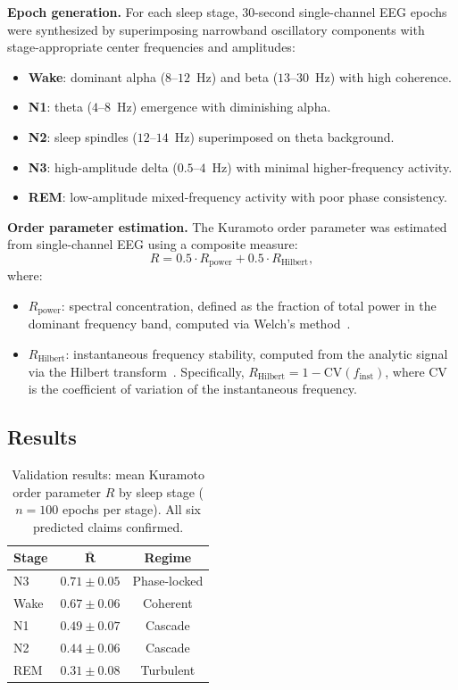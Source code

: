 \documentclass[aps,prd,twocolumn,superscriptaddress,floatfix,nofootinbib]{revtex4-2}
\theoremstyle{remark}
\newcommand{\Rorder}{R}
\begin{document}
\textbf{Epoch generation.} For each sleep stage, 30-second single-channel EEG epochs were synthesized by superimposing narrowband oscillatory components with stage-appropriate center frequencies and amplitudes:
\begin{itemize}
    \item \textbf{Wake}: dominant alpha ($8$--$12$~Hz) and beta ($13$--$30$~Hz) with high coherence.
    \item \textbf{N1}: theta ($4$--$8$~Hz) emergence with diminishing alpha.
    \item \textbf{N2}: sleep spindles ($12$--$14$~Hz) superimposed on theta background.
    \item \textbf{N3}: high-amplitude delta ($0.5$--$4$~Hz) with minimal higher-frequency activity.
    \item \textbf{REM}: low-amplitude mixed-frequency activity with poor phase consistency.
\end{itemize}

\textbf{Order parameter estimation.} The Kuramoto order parameter was estimated from single-channel EEG using a composite measure:
\begin{equation}
    \Rorder = 0.5 \cdot \Rorder_{\text{power}} + 0.5 \cdot \Rorder_{\text{Hilbert}},
    \label{eq:R_composite}
\end{equation}
where:
\begin{itemize}
    \item $\Rorder_{\text{power}}$: spectral concentration, defined as the fraction of total power in the dominant frequency band, computed via Welch's method~\cite{welch1967use}.
    \item $\Rorder_{\text{Hilbert}}$: instantaneous frequency stability, computed from the analytic signal via the Hilbert transform~\cite{cohen2008oscillations}. Specifically, $\Rorder_{\text{Hilbert}} = 1 - \text{CV}(f_{\text{inst}})$, where $\text{CV}$ is the coefficient of variation of the instantaneous frequency.
\end{itemize}

\subsection{Results}

\begin{table}[h]
\centering
\caption{Validation results: mean Kuramoto order parameter $\Rorder$ by sleep stage ($n = 100$ epochs per stage). All six predicted claims confirmed.}
\label{tab:validation}
\begin{tabular}{@{}lcc@{}}
\toprule
\textbf{Stage} & $\boldsymbol{\bar{\Rorder}}$ & \textbf{Regime} \\
\midrule
N3 & $0.71 \pm 0.05$ & Phase-locked \\
Wake & $0.67 \pm 0.06$ & Coherent \\
N1 & $0.49 \pm 0.07$ & Cascade \\
N2 & $0.44 \pm 0.06$ & Cascade \\
REM & $0.31 \pm 0.08$ & Turbulent \\
\bottomrule
\end{tabular}
\end{table}
\end{document}
